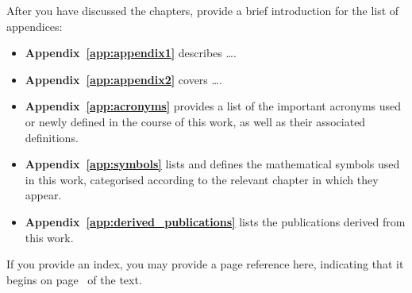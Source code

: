 After you have discussed the chapters, provide a brief introduction for the list of appendices:
\begin{itemize}
	\item\textbf{Appendix~\ref{app:appendix1}} describes \ldots.
	
	\item\textbf{Appendix~\ref{app:appendix2}} covers \ldots.
	
	\item\textbf{Appendix~\ref{app:acronyms}} provides a list of the important acronyms used or newly defined in the course of this work, as well as their associated definitions.
	
	\item\textbf{Appendix~\ref{app:symbols}} lists and defines the mathematical symbols used in this work, categorised according to the relevant chapter in which they appear.
	
	\item\textbf{Appendix~\ref{app:derived_publications}} lists the publications derived from this work.
\end{itemize}

If you provide an index, you may provide a page reference here, indicating that it begins on page~\pageref{index} of the text.

